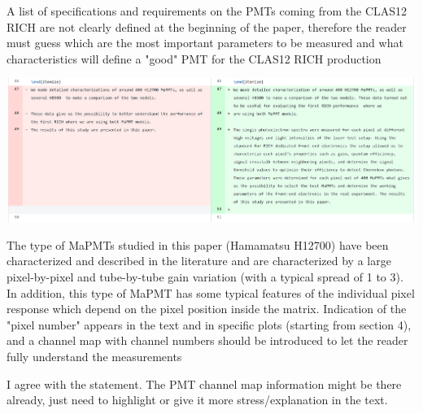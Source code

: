 \documentclass[11pt]{report}
\begin{document}
\begin{tcolorbox}[enlarge top by=2em,colbacktitle=blue!60!white,colframe=black!80!white,left=0pt,right=0pt,top=0pt,bottom=0pt,boxrule=0.3pt,title=\bfseries2.02]
A list of specifications and requirements on the PMTs coming from the CLAS12 RICH are not clearly defined at the beginning of the paper, therefore the reader must guess which are the most important parameters to be measured and what characteristics will define a "good" PMT for the CLAS12 RICH production
\end{tcolorbox}

\includegraphics[width=\linewidth]{round1/2.02.png}


\begin{tcolorbox}[enlarge top by=2em,colbacktitle=red!60!white,colframe=black!80!white,left=0pt,right=0pt,top=0pt,bottom=0pt,boxrule=0.3pt,title=\bfseries2.03]
The type of MaPMTs studied in this paper (Hamamatsu H12700) have been characterized and described in the literature and are characterized by a large pixel-by-pixel and tube-by-tube gain variation (with a typical spread of 1 to 3). In addition, this type of MaPMT has some typical features of the individual pixel response which depend on the pixel position inside the matrix. Indication of the "pixel number" appears in the text and in specific plots (starting from section 4), and a channel map with channel numbers should be introduced to let the reader fully understand the measurements
\end{tcolorbox}

{\centering
\begin{tcolorbox}[enlarge top by=2em,colbacktitle=green!60!white,colframe=black!80!white,width=0.9\linewidth,left=30pt,right=30pt,top=10pt,bottom=10pt,boxrule=0.3pt,title=\bfseries our draft remarks]
I agree with the statement. The PMT channel map information might be there already, just need to highlight or give it more stress/explanation in the text.
\end{tcolorbox}
}
\end{document}
